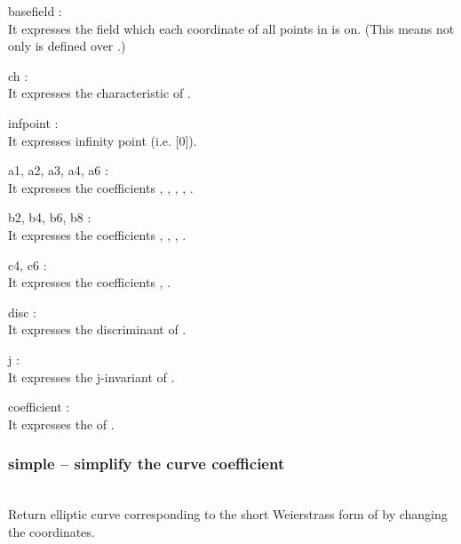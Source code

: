   \begin{at}
    \item[basefield]:\\ It expresses the field which each coordinate of all points in  is on.
(This means not only  is defined over .)
    \item[ch]:\\ It expresses the characteristic of .
    \item[infpoint]:\\ It expresses infinity point (i.e. [0]).
    \item[a1, a2, a3, a4, a6]:\\ It expresses the coefficients , , , , .
    \item[b2, b4, b6, b8]:\\ It expresses the coefficients , , , .
    \item[c4, c6]:\\ It expresses the coefficients , .
    \item[disc]:\\ It expresses the discriminant of .
    \item[j]:\\ It expresses the j-invariant of .
    \item[coefficient]:\\ It expresses the  of .
\end{at}
  \method
  \subsubsection{simple -- simplify the curve coefficient}
   \\
   \spacing
   \quad Return elliptic curve corresponding to the short Weierstrass form of  by changing the coordinates.\\
%
